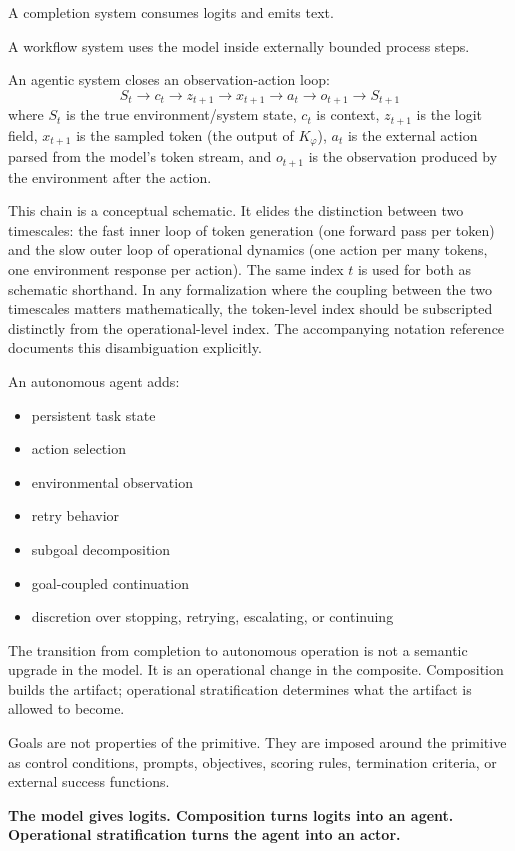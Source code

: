 \documentclass[11pt]{article}
\begin{document}
A completion system consumes logits and emits text.

A workflow system uses the model inside externally bounded process steps.

An agentic system closes an observation-action loop:
\[
S_t \rightarrow c_t \rightarrow z_{t+1} \rightarrow x_{t+1} \rightarrow a_t \rightarrow o_{t+1} \rightarrow S_{t+1}
\]
where $S_t$ is the true environment/system state, $c_t$ is context, $z_{t+1}$ is the logit field, $x_{t+1}$ is the sampled token (the output of $K_\varphi$), $a_t$ is the external action parsed from the model's token stream, and $o_{t+1}$ is the observation produced by the environment after the action.

This chain is a conceptual schematic. It elides the distinction between two timescales: the fast inner loop of token generation (one forward pass per token) and the slow outer loop of operational dynamics (one action per many tokens, one environment response per action). The same index $t$ is used for both as schematic shorthand. In any formalization where the coupling between the two timescales matters mathematically, the token-level index should be subscripted distinctly from the operational-level index. The accompanying notation reference documents this disambiguation explicitly.

An autonomous agent adds:
\begin{itemize}
\item persistent task state
\item action selection
\item environmental observation
\item retry behavior
\item subgoal decomposition
\item goal-coupled continuation
\item discretion over stopping, retrying, escalating, or continuing
\end{itemize}

The transition from completion to autonomous operation is not a semantic upgrade in the model. It is an operational change in the composite. Composition builds the artifact; operational stratification determines what the artifact is allowed to become.

Goals are not properties of the primitive. They are imposed around the primitive as control conditions, prompts, objectives, scoring rules, termination criteria, or external success functions.

\begin{pullquote}
\textbf{The model gives logits. Composition turns logits into an agent. Operational stratification turns the agent into an actor.}
\end{pullquote}
\end{document}

